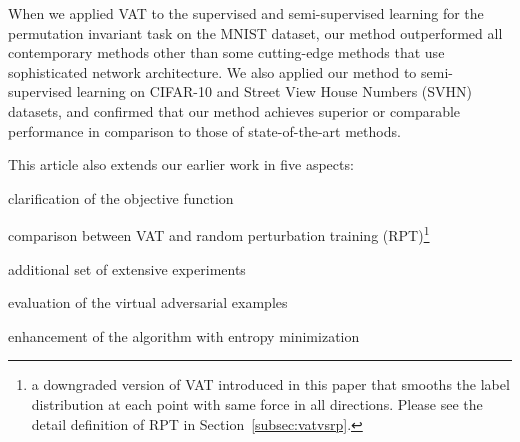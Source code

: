 \documentclass[10pt,journal,compsoc]{IEEEtran}
\newcommand\mwrite[1]{\textcolor{green}{Miyato: #1}}
\newcommand\iwrite[1]{\textcolor{red}{Meada: #1}}
\newenvironment{tight_itemize}{
\begin{itemize}
  \setlength{\itemsep}{0pt}
  \setlength{\parskip}{0pt}
  \setlength{\topsep}{0pt}
  \setlength{\partopsep}{0pt}
}{\end{itemize}}
\begin{document}

When we applied VAT to the supervised and semi-supervised learning for the permutation invariant task on the MNIST dataset, our method outperformed all contemporary methods other than some cutting-edge methods that use sophisticated network architecture.
We also applied our method to semi-supervised learning on CIFAR-10 and Street View House Numbers (SVHN) datasets, and confirmed that our method achieves superior or comparable performance in comparison to those of state-of-the-art methods.

This article also extends our earlier work \cite{miyato2015distributional} in five aspects:
\begin{tight_itemize}
\item clarification of the objective function
\item comparison between VAT and random perturbation training (RPT)\footnote{a downgraded version of VAT introduced in this paper that smooths the label distribution at each point with same force in all directions. Please see the detail definition of RPT in Section~\ref{subsec:vatvsrp}.}
\item additional set of extensive experiments
\item evaluation of the virtual adversarial examples
\item enhancement of the algorithm with entropy minimization
\end{tight_itemize}
\end{document}
